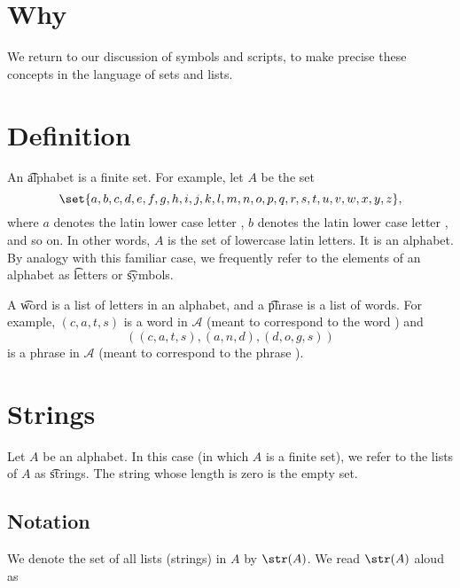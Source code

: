 
\section*{Why}

We return to our discussion of symbols and scripts, to make precise these concepts in the language of sets and lists.

\section*{Definition}

An \t{alphabet} is a finite set.
For example, let $A$ be the set
    \[
\set{a, b, c, d, e, f,g,h,i,j,k,l,m,n,o,p,q,r,s,t,u,v,w, x, y,z},
    \]
where $a$ denotes the latin lower case letter , $b$ denotes the latin lower case letter , and so on.
In other words, $A$ is the set of lowercase latin letters.
It is an alphabet.
By analogy with this familiar case, we frequently refer to the elements of an alphabet as \t{letters} or \t{symbols}.

A \t{word} is a list of letters in an alphabet, and a \t{phrase} is a list of words.
For example, $(c,a,t,s)$ is a word in $\mathcal{A} $ (meant to correspond to the word ) and
    \[
((c,a,t,s), (a,n,d), (d,o,g,s))
    \]
is a phrase in $\mathcal{A} $ (meant to correspond to the phrase ).

\section*{Strings}

Let $A$ be an alphabet.
In this case (in which $A$ is a finite set), we refer to the lists of $A$ as \t{strings}.
The string whose length is zero is the empty set.

\subsection*{Notation}

We denote the set of all lists (strings) in $A$ by $\str(A)$.
We read $\str(A)$ aloud as 
